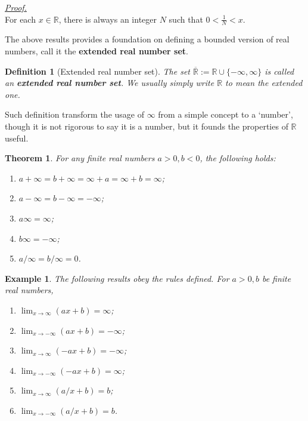 \documentclass[12pt]{article}
\newtheorem{definition}{Definition}[section]
\newtheorem*{theorem}{Theorem}
\newtheorem*{example}{Example}
\renewenvironment{proof}[1][Proof]{\begin{snugshade*} \underline{\textit{{#1}.}}\\}{\hfill \qedsymbol \end{snugshade*}}
\begin{document}
    \begin{proof}
        For each $x\in\mathbb{R}$, there is always an integer $N$ such that $0<\frac{1}{N}<x$.
    \end{proof}

    The above results provides a foundation on defining a bounded version of real numbers, call it the \textbf{extended real number set}.

    \begin{definition}[Extended real number set]
        The set $\overline{\mathbb{R}}:=\mathbb{R}\cup\{-\infty,\infty\}$ is called an \textbf{extended real number set}. We usually simply write $\mathbb{R}$ to mean the extended one.
    \end{definition}

    Such definition transform the usage of $\infty$ from a simple concept to a `number', though it is not rigorous to say it is a number, but it founds the properties of $\mathbb{R}$ useful.

    \begin{theorem}
        For any finite real numbers $a>0,b<0$, the following holds:\begin{enumerate}
            \item $a+\infty=b+\infty=\infty+a=\infty+b=\infty$;
            \item $a-\infty=b-\infty=-\infty$;
            \item $a\infty=\infty$;
            \item $b\infty=-\infty$;
            \item $a/\infty=b/\infty=0$.
        \end{enumerate}
    \end{theorem}

    \begin{example}
        The following results obey the rules defined. For $a>0,b$ be finite real numbers,
        \begin{enumerate}
            \item $\displaystyle\lim_{x\to \infty}(ax+b)=\infty$;
            \item $\displaystyle\lim_{x\to -\infty}(ax+b)=-\infty$;
            \item $\displaystyle\lim_{x\to \infty}(-ax+b)=-\infty$;
            \item $\displaystyle\lim_{x\to -\infty}(-ax+b)=\infty$;
            \item $\displaystyle\lim_{x\to \infty}(a/x+b)=b$;
            \item $\displaystyle\lim_{x\to -\infty}(a/x+b)=b$.
        \end{enumerate}
    \end{example}
\end{document}
